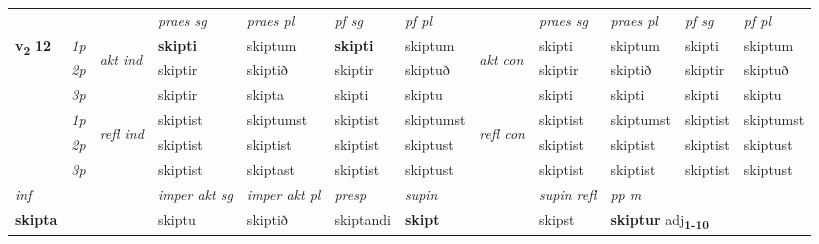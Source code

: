 \begin{longtable}[l]{X>{\footnotesize\itshape}llXXXXlXXXX}
 & &   & \textit{praes sg}  & \textit{praes pl}    & \textit{ pf sg} & \textit{pf pl} & & \textit{praes sg}  & \textit{praes pl}    & \textit{pf sg} & \textit{pf pl }  \\ \cmidrule{4-7} \cmidrule{9-12}
 \multirow{2}{*}{{{\textbf{v{\textsubscript{2}}} \Large{\textbf{12}}}}}  & 1p & \multirow{3}{*}{\begin{turn}{90}\textit{akt ind}\end{turn}} & \textbf{skipti} & skiptum & \textbf{skipti} & skiptum & \multirow{3}{*}{\begin{turn}{90}\textit{akt con}\end{turn}} &skipti & skiptum & skipti & skiptum\\*
 & 2p &  &  skiptir  & skiptið & skiptir & skiptuð & & skiptir & skiptið & skiptir & skiptuð \\*
 & 3p &  & skiptir & skipta & skipti & skiptu & & skipti & skipti& skipti & skiptu \\*
\cmidrule{4-7} \cmidrule{9-12}
 & 1p & \multirow{3}{*}{\begin{turn}{90}\textit{refl ind}\end{turn}}  & skiptist & skiptumst & skiptist & skiptumst & \multirow{3}{*}{\begin{turn}{90}\textit{refl con}\end{turn}}  &skiptist & skiptumst & skiptist & skiptumst \\*
 & 2p &  & skiptist & skiptist & skiptist & skiptust & &skiptist & skiptist & skiptist & skiptust \\*
 & 3p  & & skiptist & skiptast & skiptist & skiptust & & skiptist & skiptist& skiptist & skiptust \\*
\cmidrule{4-7} \cmidrule{9-12}

   {\textit{inf}} & &  & \textit{imper akt sg} & \textit{imper akt pl}   & \textit{presp} & \textit{supin} && \textit{supin refl} & \textit{pp m} \\*
  {\textbf{skipta}} & && skiptu  & skiptið   & skiptandi &  \textbf{skipt} && skipst & \multicolumn{2}{l}{\textbf{skiptur} adj\textbf{\textsubscript{1-10}}} \\*

\midrule


\end{longtable}
